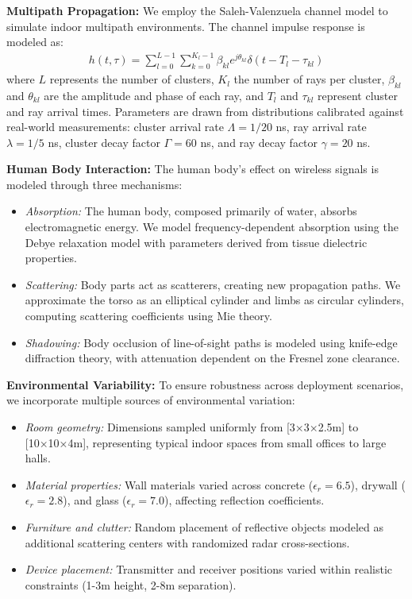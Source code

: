 \documentclass[journal]{IEEEtran}
\begin{document}
\textbf{Multipath Propagation:} We employ the Saleh-Valenzuela channel model to simulate indoor multipath environments. The channel impulse response is modeled as:
\begin{align}
h(t,\tau) = \sum_{l=0}^{L-1} \sum_{k=0}^{K_l-1} \beta_{kl} e^{j\theta_{kl}} \delta(t - T_l - \tau_{kl})
\end{align}
where $L$ represents the number of clusters, $K_l$ the number of rays per cluster, $\beta_{kl}$ and $\theta_{kl}$ are the amplitude and phase of each ray, and $T_l$ and $\tau_{kl}$ represent cluster and ray arrival times. Parameters are drawn from distributions calibrated against real-world measurements: cluster arrival rate $\Lambda = 1/20$ ns, ray arrival rate $\lambda = 1/5$ ns, cluster decay factor $\Gamma = 60$ ns, and ray decay factor $\gamma = 20$ ns.

\textbf{Human Body Interaction:} The human body's effect on wireless signals is modeled through three mechanisms:
\begin{itemize}
\item \textit{Absorption:} The human body, composed primarily of water, absorbs electromagnetic energy. We model frequency-dependent absorption using the Debye relaxation model with parameters derived from tissue dielectric properties.
\item \textit{Scattering:} Body parts act as scatterers, creating new propagation paths. We approximate the torso as an elliptical cylinder and limbs as circular cylinders, computing scattering coefficients using Mie theory.
\item \textit{Shadowing:} Body occlusion of line-of-sight paths is modeled using knife-edge diffraction theory, with attenuation dependent on the Fresnel zone clearance.
\end{itemize}

\textbf{Environmental Variability:} To ensure robustness across deployment scenarios, we incorporate multiple sources of environmental variation:
\begin{itemize}
\item \textit{Room geometry:} Dimensions sampled uniformly from [3×3×2.5m] to [10×10×4m], representing typical indoor spaces from small offices to large halls.
\item \textit{Material properties:} Wall materials varied across concrete ($\epsilon_r = 6.5$), drywall ($\epsilon_r = 2.8$), and glass ($\epsilon_r = 7.0$), affecting reflection coefficients.
\item \textit{Furniture and clutter:} Random placement of reflective objects modeled as additional scattering centers with randomized radar cross-sections.
\item \textit{Device placement:} Transmitter and receiver positions varied within realistic constraints (1-3m height, 2-8m separation).
\end{itemize}
\end{document}
